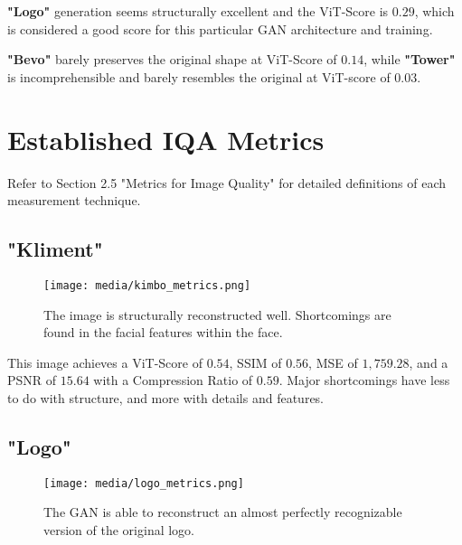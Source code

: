 \textbf{"Logo"} generation seems structurally excellent and the ViT-Score is $0.29$, which
is considered a good score for this particular GAN architecture and training.

\textbf{"Bevo"} barely preserves the original shape at ViT-Score of $0.14$, while
\textbf{"Tower"} is incomprehensible and barely resembles the original at ViT-score of $0.03$.

\vspace{4mm}



\section{Established IQA Metrics}

Refer to Section 2.5 "Metrics for Image Quality" for detailed definitions 
of each measurement technique.


\subsection{"Kliment"}

\begin{figure}[H]
	\begin{center}
	\texttt{[image: media/kimbo\_metrics.png]}
	\end{center}
	\caption["Kliment" Established Metrics]{The image is structurally reconstructed well.
    Shortcomings are found in the facial features within the face.}
	\end{figure}


This image achieves a ViT-Score of $0.54$, SSIM of $0.56$, MSE of $1,759.28$, and a PSNR of $15.64$ with a Compression Ratio of $0.59$.
Major shortcomings have less to do with structure, and more with details and features.

\subsection{"Logo"}

\begin{figure}[H]
	\begin{center}
	\texttt{[image: media/logo\_metrics.png]}
	\end{center}
	\caption["Logo" Established Metrics]{The GAN is able to reconstruct an almost 
    perfectly recognizable version of the original logo.}
	\end{figure}


